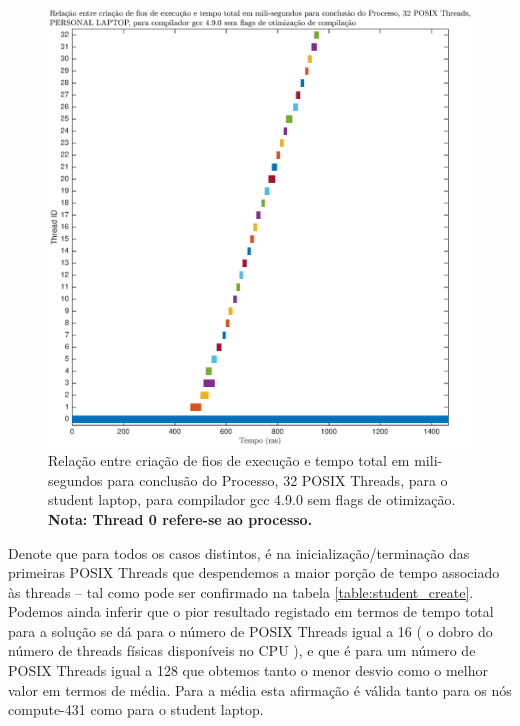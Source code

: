 \documentclass[conference,compsoc]{IEEEtran}
\begin{document}
\begin{figure}[H]
\centering
\includegraphics[width=1.1\columnwidth]{EPS/time_create_32T.eps}
\caption{Relação entre criação de fios de execução e tempo total em mili-segundos para conclusão do Processo, 32 POSIX Threads, para o student laptop, para compilador gcc 4.9.0 sem flags de otimização. \textbf{Nota: Thread 0 refere-se ao processo. }}
\label{fig:create_32}
\end{figure}

Denote que para todos os casos distintos, é na inicialização/terminação das primeiras POSIX Threads que despendemos a maior porção de tempo associado às threads -- tal como pode ser confirmado na tabela \ref{table:student_create}. Podemos ainda inferir que o pior resultado registado em termos de tempo total para a solução se dá para o número de POSIX Threads igual a 16 ( o dobro do número de threads físicas disponíveis no CPU ), e que é para um número de POSIX Threads igual a 128 que obtemos tanto o menor desvio como o melhor valor em termos de média. Para a média esta afirmação é válida tanto para os nós compute-431 como para o student laptop. \par 
\end{document}
